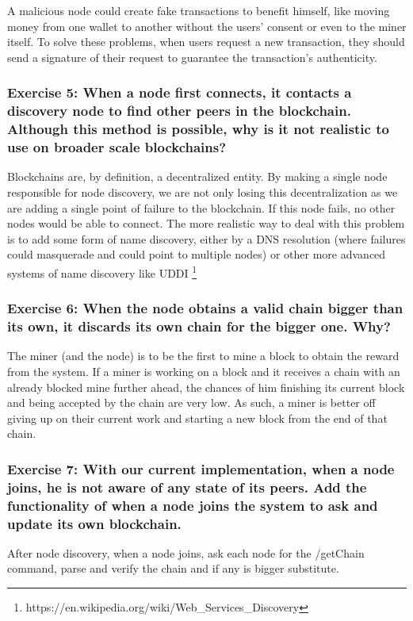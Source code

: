 \documentclass[12pt,a4paper]{article}
\begin{document}
A malicious node could create fake transactions to benefit himself, like moving money from one wallet to another without the users' consent or even to the miner itself. To solve these problems, when users request a new transaction, they should send a signature of their request to guarantee the transaction's authenticity.

\subsubsection*{Exercise 5: When a node first connects, it contacts a discovery node to find other peers in the blockchain. Although this method is possible, why is it not realistic to use on broader scale blockchains? }

Blockchains are, by definition, a decentralized entity. By making a single node responsible for node discovery, we are not only losing this decentralization as we are adding a single point of failure to the blockchain. If this node fails, no other nodes would be able to connect. The more realistic way to deal with this problem is to add some form of name discovery, either by a DNS resolution (where failures could masquerade and could point to multiple nodes) or other more advanced systems of name discovery like UDDI \footnote{https://en.wikipedia.org/wiki/Web\_Services\_Discovery}

\subsubsection*{Exercise 6: When the node obtains a valid chain bigger than its own, it discards its own chain for the bigger one. Why? }

The miner (and the node) is to be the first to mine a block to obtain the reward from the system. If a miner is working on a block and it receives a chain with an already blocked mine further ahead, the chances of him finishing its current block and being accepted by the chain are very low. As such, a miner is better off giving up on their current work and starting a new block from the end of that chain.

\subsubsection*{Exercise 7: With our current implementation, when a node joins, he is not aware of any state of its peers. Add the functionality of when a node joins the system to ask and update its own blockchain.}

After node discovery, when a node joins, ask each node for the /getChain command, parse and verify the chain and if any is bigger substitute.




\end{document}
